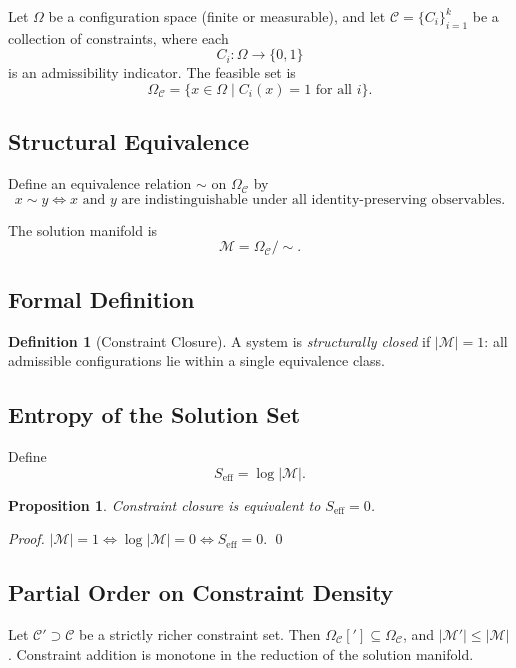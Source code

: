 \documentclass[11pt, twoside]{article}
\theoremstyle{plain}
\newtheorem{proposition}[theorem]{Proposition}
\theoremstyle{definition}
\newtheorem{definition}[theorem]{Definition}
\theoremstyle{remark}
\newcommand{\OmC}{\Omega_{\mathcal{C}}}
\newcommand{\Seff}{S_{\text{eff}}}
\begin{document}
Let $\Omega$ be a configuration space (finite or measurable), and let $\mathcal{C} = \{C_i\}_{i=1}^k$ be a collection of constraints, where each
\[
C_i : \Omega \to \{0,1\}
\]
is an admissibility indicator. The feasible set is
\[
\OmC = \{ x \in \Omega \mid C_i(x) = 1 \text{ for all } i \}.
\]

\subsection{Structural Equivalence}

Define an equivalence relation $\sim$ on $\OmC$ by
\[
x \sim y \iff x \text{ and } y \text{ are indistinguishable under all identity-preserving observables.}
\]

The solution manifold is
\[
\mathcal{M} = \OmC / {\sim}.
\]

\subsection{Formal Definition}

\begin{definition}[Constraint Closure]
A system is \emph{structurally closed} if $|\mathcal{M}| = 1$: all admissible configurations lie within a single equivalence class.
\end{definition}

\subsection{Entropy of the Solution Set}

Define
\[
\Seff = \log |\mathcal{M}|.
\]

\begin{proposition}
Constraint closure is equivalent to $\Seff = 0$.
\end{proposition}

\begin{proof}
$|\mathcal{M}| = 1 \iff \log |\mathcal{M}| = 0 \iff \Seff = 0$. \qed
\end{proof}

\subsection{Partial Order on Constraint Density}

Let $\mathcal{C}' \supset \mathcal{C}$ be a strictly richer constraint set. Then $\OmC['] \subseteq \OmC$, and $|\mathcal{M}'| \leq |\mathcal{M}|$. Constraint addition is monotone in the reduction of the solution manifold.
\end{document}
